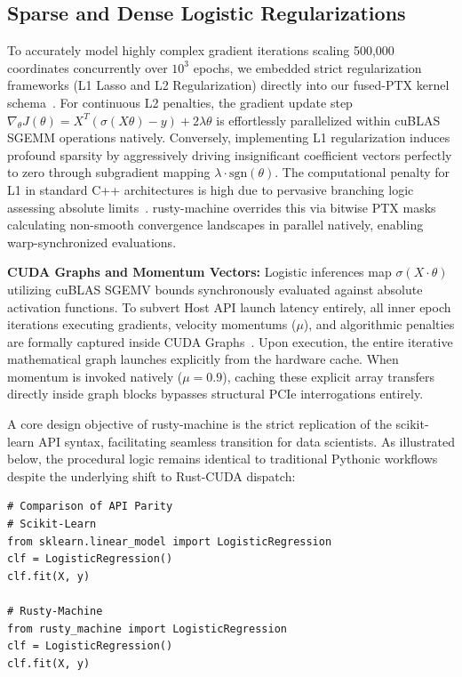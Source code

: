 \documentclass[conference]{IEEEtran}
\begin{document}
\subsection{Sparse and Dense Logistic Regularizations} 
To accurately model highly complex gradient iterations scaling 500,000 coordinates concurrently over $10^3$ epochs, we embedded strict regularization frameworks (L1 Lasso and L2 Regularization) directly into our fused-PTX kernel schema~\cite{ref26,ref27}.
For continuous L2 penalties, the gradient update step $\nabla_\theta J(\theta) = X^T(\sigma(X\theta) - y) + 2\lambda\theta$ is effortlessly parallelized within cuBLAS SGEMM operations natively.
Conversely, implementing L1 regularization induces profound sparsity by aggressively driving insignificant coefficient vectors perfectly to zero through subgradient mapping $\lambda \cdot \text{sgn}(\theta)$. The computational penalty for L1 in standard C++ architectures is high due to pervasive branching logic assessing absolute limits~\cite{ref19}. rusty-machine overrides this via bitwise PTX masks calculating non-smooth convergence landscapes in parallel natively, enabling warp-synchronized evaluations.

\textbf{CUDA Graphs and Momentum Vectors:}
Logistic inferences map $\sigma(X \cdot \theta)$ utilizing cuBLAS SGEMV bounds synchronously evaluated against absolute activation functions. To subvert Host API launch latency entirely, all inner epoch iterations executing gradients, velocity momentums ($\mu$), and algorithmic penalties are formally captured inside CUDA Graphs~\cite{ref25}. Upon execution, the entire iterative mathematical graph launches explicitly from the hardware cache. When momentum is invoked natively ($\mu=0.9$), caching these explicit array transfers directly inside graph blocks bypasses structural PCIe interrogations entirely.

A core design objective of rusty-machine is the strict replication of the scikit-learn API syntax, facilitating seamless transition for data scientists. As illustrated below, the procedural logic remains identical to traditional Pythonic workflows despite the underlying shift to Rust-CUDA dispatch:

\begin{lstlisting}[caption={API Parity between Scikit-Learn and Rusty-Machine}, label={code:api}]
# Comparison of API Parity
# Scikit-Learn
from sklearn.linear_model import LogisticRegression
clf = LogisticRegression()
clf.fit(X, y)

# Rusty-Machine
from rusty_machine import LogisticRegression
clf = LogisticRegression()
clf.fit(X, y)
\end{lstlisting}
\end{document}
